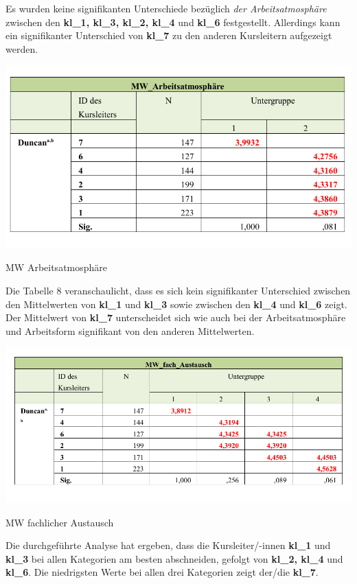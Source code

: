 \documentclass[12pt,a4paper]{article}
\begin{document}
Es wurden keine signifikanten Unterschiede bezüglich \textit{der Arbeitsatmosphäre} zwischen den \textbf{kl\_1, kl\_3, kl\_2, kl\_4} und \textbf{kl\_6} festgestellt. Allerdings kann ein signifikanter Unterschied von \textbf{kl\_7} zu den anderen Kursleitern aufgezeigt werden. 


\begin{table}[!ht]
\includegraphics[scale=1.0]{tab02.pdf}
\caption{MW Arbeitsatmosphäre}
\label{tab.7}
\end{table}
\FloatBarrier


Die Tabelle 8 veranschaulicht, dass es sich kein signifikanter Unterschied zwischen den Mittelwerten von \textbf{kl\_1} und \textbf{kl\_3} sowie zwischen den \textbf{kl\_4} und \textbf{kl\_6} zeigt. Der Mittelwert von \textbf{kl\_7} unterscheidet sich wie auch bei der Arbeitsatmosphäre und Arbeitsform signifikant von den anderen Mittelwerten.

\begin{table}[!ht]
\includegraphics[scale=0.82]{tab03.pdf}
\caption{MW fachlicher Austausch}
\label{tab.8}
\end{table}
\FloatBarrier

Die durchgeführte Analyse hat ergeben, dass die Kursleiter/-innen \textbf{kl\_1} und \textbf{kl\_3} bei allen Kategorien am besten abschneiden, gefolgt von \textbf{kl\_2, kl\_4} und \textbf{kl\_6}. Die niedrigsten Werte bei allen drei Kategorien zeigt der/die \textbf{kl\_7}.
\end{document}
